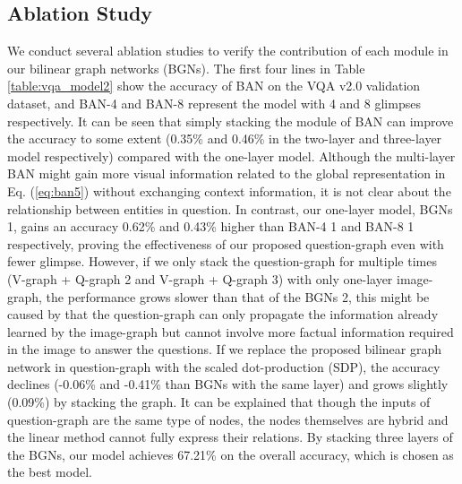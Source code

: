 \documentclass[10pt,twocolumn,letterpaper]{article}
\begin{document}
\subsection{Ablation Study}
We conduct several ablation studies to verify the contribution of each module in our bilinear graph networks (BGNs). The first four lines in Table \ref{table:vqa_model2} show the accuracy of BAN on the VQA v2.0 validation dataset, and BAN-4 and BAN-8 represent the model with 4 and 8 glimpses respectively. It can be seen that simply stacking the module of BAN can improve the accuracy to some extent (0.35\% and 0.46\% in the two-layer and three-layer model respectively) compared with the one-layer model. Although the multi-layer BAN might gain more visual information related to the global representation in Eq. (\ref{eq:ban5}) without exchanging context information, it is not clear about the relationship between entities in question. In contrast, our one-layer model, BGNs  1, gains an accuracy 0.62\% and 0.43\% higher than BAN-4  1 and BAN-8  1 respectively, proving the effectiveness of our proposed question-graph even with fewer glimpse. However, if we only stack the question-graph for multiple times (V-graph + Q-graph  2 and V-graph + Q-graph  3) with only one-layer image-graph, the performance grows slower than that of the BGNs  2, this might be caused by that the question-graph can only propagate the information already learned by the image-graph but cannot involve more factual information required in the image to answer the questions. If we replace the proposed bilinear graph network in question-graph with the scaled dot-production (SDP), the accuracy declines (-0.06\% and -0.41\% than BGNs with the same layer) and grows slightly (0.09\%) by stacking the graph. It can be explained that though the inputs of question-graph  are the same type of nodes, the nodes themselves are hybrid and the linear method cannot fully express their relations. By stacking three layers of the BGNs, our model achieves 67.21\% on the overall accuracy, which is chosen as the best model.
\end{document}
